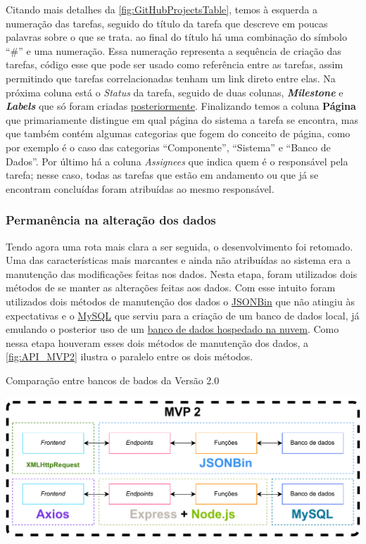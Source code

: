 Citando mais detalhes da \autoref{fig:GitHubProjectsTable}, temos à esquerda a numeração das tarefas, seguido do título da tarefa que descreve em poucas palavras sobre o que se trata. ao final do título há uma combinação do símbolo ``\#'' e uma numeração. Essa numeração representa a sequência de criação das tarefas, código esse que pode ser usado como referência entre as tarefas, assim permitindo que tarefas correlacionadas tenham um link direto entre elas. Na próxima coluna está o \textit{Status} da tarefa, seguido de duas colunas, \textbf{\textit{Milestone}} e \textbf{\textit{Labels}} que só foram criadas \hyperref[ssssec:Marcos e Etiquetas]{posteriormente}. Finalizando temos a coluna \textbf{Página} que primariamente distingue em qual página do sistema a tarefa se encontra, mas que também contém algumas categorias que fogem do conceito de página, como por exemplo é o caso das categorias ``Componente'', ``Sistema'' e ``Banco de Dados''. Por último há a coluna \textit{Assignees} que indica quem é o responsável pela tarefa; nesse caso, todas as tarefas que estão em andamento ou que já se encontram concluídas foram atribuídas ao mesmo responsável.

\subsubsection*{Permanência na alteração dos dados} \label{sssec:Permanência dos Dados}

Tendo agora uma rota mais clara a ser seguida, o desenvolvimento foi retomado. Uma das características mais marcantes e ainda não atribuídas ao sistema era a manutenção das modificações feitas nos dados. Nesta etapa, foram utilizados dois métodos de se manter as alterações feitas aos dados. Com esse intuito foram utilizados dois métodos de manutenção dos dados o \hyperref[ssssec:JSONBin]{JSONBin} que não atingiu às expectativas e o \hyperref[ssssec:MySQL]{MySQL} que serviu para a criação de um banco de dados local, já emulando o posterior uso de um \hyperref[sssec:Amazon Web Services]{banco de dados hospedado na nuvem}. Como nessa etapa houveram esses dois métodos de manutenção dos dados, a \autoref{fig:API_MVP2} ilustra o paralelo entre os dois métodos.

\begin{MyCenteredFigure} \caption{Comparação entre bancos de bados da Versão 2.0} \label{fig:API_MVP2}
  \includegraphics[width=\textwidth]{files/img/2.02!5-desenvolvimento/2.02!5.1.4-sistema/diagramas/API/API_MVP2}
\end{MyCenteredFigure}

